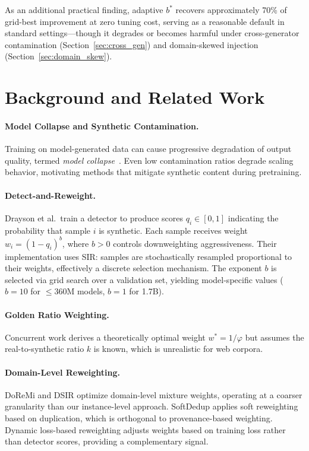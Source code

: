 \documentclass[11pt]{article}
\begin{document}
As an additional practical finding, adaptive $b^*$ recovers approximately 70\% of grid-best improvement at zero tuning cost, serving as a reasonable default in standard settings---though it degrades or becomes harmful under cross-generator contamination (Section~\ref{sec:cross_gen}) and domain-skewed injection (Section~\ref{sec:domain_skew}).

\section{Background and Related Work}
\label{sec:background}

\paragraph{Model Collapse and Synthetic Contamination.}
Training on model-generated data can cause progressive degradation of output quality, termed \emph{model collapse}~\citep{shumailov2024strong}.
Even low contamination ratios degrade scaling behavior, motivating methods that mitigate synthetic content during pretraining.

\paragraph{Detect-and-Reweight.}
Drayson et al.\ train a detector to produce scores $q_i \in [0,1]$ indicating the probability that sample $i$ is synthetic.
Each sample receives weight $w_i = (1 - q_i)^b$, where $b > 0$ controls downweighting aggressiveness.
Their implementation uses SIR: samples are stochastically resampled proportional to their weights, effectively a discrete selection mechanism.
The exponent $b$ is selected via grid search over a validation set, yielding model-specific values ($b = 10$ for $\leq$360M models, $b = 1$ for 1.7B).

\paragraph{Golden Ratio Weighting.}
Concurrent work derives a theoretically optimal weight $w^* = 1/\varphi$ but assumes the real-to-synthetic ratio $k$ is known, which is unrealistic for web corpora.

\paragraph{Domain-Level Reweighting.}
DoReMi and DSIR optimize domain-level mixture weights, operating at a coarser granularity than our instance-level approach.
SoftDedup applies soft reweighting based on duplication, which is orthogonal to provenance-based weighting.
Dynamic loss-based reweighting adjusts weights based on training loss rather than detector scores, providing a complementary signal.
\end{document}
